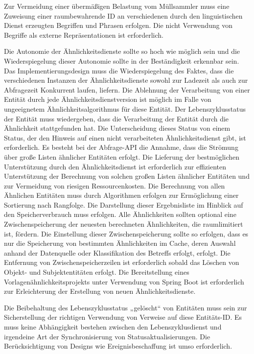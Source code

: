 Zur Vermeidung einer übermäßigen Belastung vom Müllsammler muss eine Zuweisung einer raumbewahrende ID an verschiedenen durch den linguistischen Dienst erzeugten Begriffen und Phrasen erfolgen. Die nicht Verwendung von Begriffe als externe Repräsentationen ist erforderlich.

Die Autonomie der Ähnlichkeitsdienste sollte so hoch wie möglich sein und die Wiederspiegelung dieser Autonomie sollte in der Beständigkeit erkennbar sein. Das Implementierungsdesign muss die Wiederspiegelung des Faktes, dass die verschiedenen Instanzen der Ähnlichkeitsdienste sowohl zur Ladezeit als auch zur Abfragezeit Konkurrent laufen, liefern. Die Ablehnung der Verarbeitung von einer Entität durch jede Ähnlichkeitsdienstversion ist möglich im Falle von ungeeignetem Ähnlichkeitsalgorithmus für diese Entität. Der Lebenszyklusstatus der Entität muss wiedergeben, dass die Verarbeitung der Entität durch die Ähnlichkeit stattgefunden hat. Die Unterscheidung dieses Status von einem Status, der den Hinweis auf einen nicht verarbeiteten Ähnlichkeitsdienst gibt, ist erforderlich. Es besteht bei der Abfrage-API die Annahme, dass die Strömung über große Listen ähnlicher Entitäten erfolgt. Die Lieferung der bestmöglichen Unterstützung durch den Ähnlichkeitsdienst ist erforderlich zur effizienten Unterstützung der Berechnung von solchen großen Listen ähnlicher Entitäten und zur Vermeidung von riesigen Ressourcenkosten. Die Berechnung von allen Ähnlichen Entitäten muss durch Algorithmen erfolgen zur Ermöglichung einer Sortierung nach Rangfolge. Die Darstellung dieser Ergebnisliste im Hinblick auf den Speicherverbrauch muss erfolgen. Alle Ähnlichkeiten sollten optional eine Zwischenspeicherung der neuesten berechneten Ähnlichkeiten, die raumlimitiert ist, fördern. Die Einstellung dieser Zwischenspeicherung sollte so erfolgen, dass es nur die Speicherung von bestimmten Ähnlichkeiten im Cache, deren Auswahl anhand der Datenquelle oder Klassifikation des Betreffs erfolgt, erfolgt. Die Entfernung von Zwischenspeicherzeilen ist erforderlich sobald das Löschen von Objekt- und Subjektentitäten erfolgt. Die Bereitstellung eines Vorlagenähnlichkeitsprojekts unter Verwendung von Spring Boot ist erforderlich zur Erleichterung der Erstellung von neuen Ähnlichkeitsdienste. 

Die Beibehaltung des Lebenszyklusstatus „gelöscht“ von Entitäten muss sein zur Sicherstellung der richtigen Verwendung von Verweise auf diese Entitäts-ID. Es muss keine Abhängigkeit bestehen zwischen den Lebenszyklusdienst und irgendeine Art der Synchronisierung von Statusaktualisierungen. Die Berücksichtigung von Designs wie Ereignisbeschaffung ist umso erforderlich.

